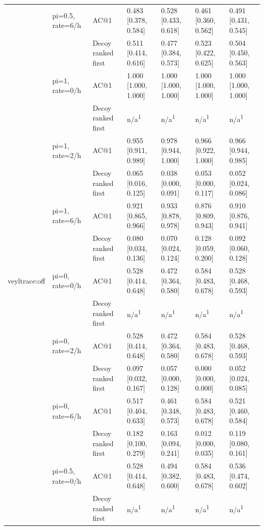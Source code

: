 \begin{table}[t]
\begin{tabular}{@{}lllllll@{}}
 & pi=0.5, rate=6/h & AC@1 & 0.483 [0.378, 0.584] & 0.528 [0.433, 0.618] & 0.461 [0.360, 0.562] & 0.491 [0.431, 0.545] \\
 &  & Decoy ranked first & 0.511 [0.414, 0.616] & 0.477 [0.384, 0.573] & 0.523 [0.422, 0.625] & 0.504 [0.450, 0.563] \\
 & pi=1, rate=0/h & AC@1 & 1.000 [1.000, 1.000] & 1.000 [1.000, 1.000] & 1.000 [1.000, 1.000] & 1.000 [1.000, 1.000] \\
 &  & Decoy ranked first & n/a\textsuperscript{1} & n/a\textsuperscript{1} & n/a\textsuperscript{1} & n/a\textsuperscript{1} \\
 & pi=1, rate=2/h & AC@1 & 0.955 [0.911, 0.989] & 0.978 [0.944, 1.000] & 0.966 [0.922, 1.000] & 0.966 [0.944, 0.985] \\
 &  & Decoy ranked first & 0.065 [0.016, 0.125] & 0.038 [0.000, 0.091] & 0.053 [0.000, 0.117] & 0.052 [0.024, 0.086] \\
 & pi=1, rate=6/h & AC@1 & 0.921 [0.865, 0.966] & 0.933 [0.878, 0.978] & 0.876 [0.809, 0.943] & 0.910 [0.876, 0.941] \\
 &  & Decoy ranked first & 0.080 [0.034, 0.136] & 0.070 [0.024, 0.124] & 0.128 [0.059, 0.200] & 0.092 [0.060, 0.128] \\
veyltrace:off & pi=0, rate=0/h & AC@1 & 0.528 [0.414, 0.648] & 0.472 [0.364, 0.580] & 0.584 [0.483, 0.678] & 0.528 [0.468, 0.593] \\
 &  & Decoy ranked first & n/a\textsuperscript{1} & n/a\textsuperscript{1} & n/a\textsuperscript{1} & n/a\textsuperscript{1} \\
 & pi=0, rate=2/h & AC@1 & 0.528 [0.414, 0.648] & 0.472 [0.364, 0.580] & 0.584 [0.483, 0.678] & 0.528 [0.468, 0.593] \\
 &  & Decoy ranked first & 0.097 [0.032, 0.167] & 0.057 [0.000, 0.128] & 0.000 [0.000, 0.000] & 0.052 [0.024, 0.085] \\
 & pi=0, rate=6/h & AC@1 & 0.517 [0.404, 0.633] & 0.461 [0.348, 0.573] & 0.584 [0.483, 0.678] & 0.521 [0.460, 0.584] \\
 &  & Decoy ranked first & 0.182 [0.100, 0.279] & 0.163 [0.094, 0.241] & 0.012 [0.000, 0.035] & 0.119 [0.080, 0.161] \\
 & pi=0.5, rate=0/h & AC@1 & 0.528 [0.414, 0.648] & 0.494 [0.382, 0.600] & 0.584 [0.483, 0.678] & 0.536 [0.474, 0.602] \\
 &  & Decoy ranked first & n/a\textsuperscript{1} & n/a\textsuperscript{1} & n/a\textsuperscript{1} & n/a\textsuperscript{1} \\

\end{tabular}
\end{table}
